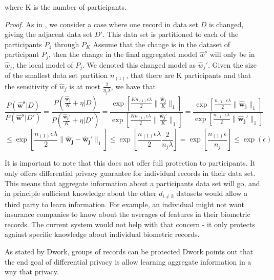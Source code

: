 where K is the number of participants.

\textit{Proof.} As in \cite{pathak2010diffprivhomo}, we consider a case where one record in data set $D$ is changed, giving the adjacent data set $D'$. This data set is partitioned to each of the participants $P_1$ through $P_K$ Assume that the change is in the dataset of participant $P_j$, then the change in the final aggregated model $\hat{w}^s$ will only be in $\hat{w}_j$, the local model of $P_j$. We denoted this changed model as $\hat{w}_j'$. Given the size of the smallest data set partition $n_{(1)}$, that there are K participants and that the sensitivity of $\hat{w}_j$ is at most $\frac{2}{\eta_j\lambda}$, we have that
$$
\frac{P(\boldsymbol{\hat{w}^s}|D)}{P(\boldsymbol{\hat{w}^s}|D')} = \frac{P(\frac{\boldsymbol{\hat{w}_j}}{K} + \eta|D)}{P(\frac{\boldsymbol{\hat{w}_j'}}{K} + \eta|D')} = \frac{\exp[\frac{K n_{(1)}\epsilon\lambda}{2}\|\frac{\boldsymbol{\hat{w}_j}}{K}\|_1]}{\exp[\frac{K n_{(1)}\epsilon\lambda}{2}\|\frac{\boldsymbol{\hat{w}_j'}}{K}\|_1]}= \frac{\exp[\frac{n_{(1)}\epsilon\lambda}{2}\|\boldsymbol{\hat{w}_j}\|_1]}{\exp[\frac{n_{(1)}\epsilon\lambda}{2}\|\boldsymbol{\hat{w}_j'}\|_1]} $$
$$\leq \exp[\frac{n_{(1)}\epsilon\lambda}{2}\|\boldsymbol{\hat{w}_j} - \boldsymbol{\hat{w}_j'}\|_1]
\leq \exp[\frac{n_{(1)}\epsilon\lambda}{2}\frac{2}{n_j\lambda}]
= \exp[\frac{n_{(1)}\epsilon}{n_j}]
\leq \exp(\epsilon)
$$



It is important to note that this does not offer full protection to participants. It only offers differential privacy guarantee for individual records in their data set. This means that aggregate information about a participants data set will go, and in principle sufficient knowledge about the other $d_{i \neq k}$ datasets would allow a third party to learn information. For example, an individual might not want insurance companies to know about the averages of features in their biometric records. The current system would not help with that concern - it only protects against specific knowledge about 
individual biometric records. 

As stated by Dwork, groups of records can be protected  \cite{Dwork06differentialprivacy} Dwork points out that the end goal of differential privacy is allow learning aggregate information in a way that privacy. 

